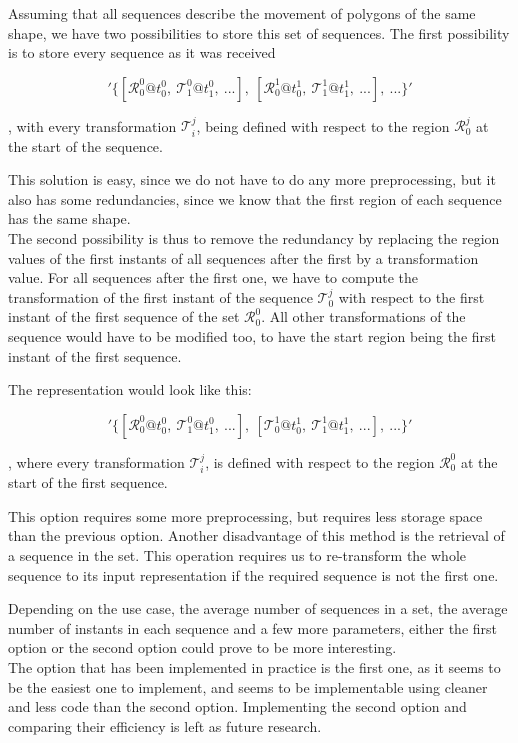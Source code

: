 Assuming that all sequences describe the movement of  polygons of the same shape, we have two possibilities to store this set of sequences. The first possibility is to store every sequence as it was received

\[
    '\{[\mathcal{R}_0^0@t_0^0,\ \mathcal{T}_1^0@t_1^0,\ ...],\ [\mathcal{R}_0^1@t_0^1,\ \mathcal{T}_1^1@t_1^1,\ ...],\ ...\}'
\]

, with every transformation $\mathcal{T}_i^j$, being defined with respect to the region $\mathcal{R}_0^j$ at the start of the sequence.

This solution is easy, since we do not have to do any more preprocessing, but it also has some redundancies, since we know that the first region of each sequence has the same shape. \\

The second possibility is thus to remove the redundancy by replacing the region values of the first instants of all sequences after the first by a transformation value. For all sequences after the first one, we have to compute the transformation of the first instant of the sequence $\mathcal{T}_0^j$ with respect to the first instant of the first sequence of the set $\mathcal{R}_0^0$. All other transformations of the sequence would have to be modified too, to have the start region being the first instant of the first sequence.

The representation would look like this:

\[
    '\{[\mathcal{R}_0^0@t_0^0,\ \mathcal{T}_1^0@t_1^0,\ ...],\ [\mathcal{T}_0^1@t_0^1,\ \mathcal{T}_1^1@t_1^1,\ ...],\ ...\}'
\]

, where every transformation $\mathcal{T}_i^j$, is defined with respect to the region $\mathcal{R}_0^0$ at the start of the first sequence.

This option requires some more preprocessing, but requires less storage space than the previous option. Another disadvantage of this method is the retrieval of a sequence in the set. This operation requires us to re-transform the whole sequence to its input representation if the required sequence is not the first one.

Depending on the use case, the average number of sequences in a set, the average number of instants in each sequence and a few more parameters, either the first option or the second option could prove to be more interesting. \\

The option that has been implemented in practice is the first one, as it seems to be the easiest one to implement, and seems to be implementable using cleaner and less code than the second option. Implementing the second option and comparing their efficiency is left as future research.

